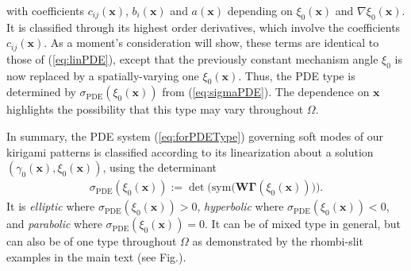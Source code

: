 \documentclass[aps,11pt,tightenlines,notitlepage,superscriptaddress,longbibliography,nofootinbib]{revtex4-1}
\begin{document}
with coefficients $c_{ij}(\mathbf{x})$, $b_i(\mathbf{x})$ and $a(\mathbf{x})$ depending on  $\xi_0(\mathbf{x})$ and $\nabla \xi_0(\mathbf{x})$. It is classified through its highest order derivatives, which involve the coefficients $c_{ij}(\mathbf{x})$. As a moment's consideration will show, these terms are identical to those of (\ref{eq:linPDE}), except  that the previously constant mechanism angle $\xi_0$ is now replaced by a spatially-varying one $\xi_0(\mathbf{x})$. Thus, the PDE type is determined by  $\sigma_{\text{PDE}}(\xi_0(\mathbf{x}))$ from (\ref{eq:sigmaPDE}). The dependence on $\mathbf{x}$ highlights the possibility that this type may vary throughout $\Omega$.

In summary, the PDE system (\ref{eq:forPDEType}) governing soft modes of our kirigami patterns is classified according to its linearization about a solution $(\gamma_0(\mathbf{x}), \xi_0(\mathbf{x}))$, using the determinant 
\begin{equation}
    \begin{aligned}\label{eq:sigmaPDE-general}
    \sigma_{\text{PDE}}(\xi_0(\mathbf{x})) := \det\Big( \text{sym}\big(\mathbf{W} \boldsymbol{\Gamma}(\xi_0(\mathbf{x}))\big)\Big).
    \end{aligned}
\end{equation}
It is \textit{elliptic} where $\sigma_{\text{PDE}}(\xi_0(\mathbf{x})) >0$, \textit{hyperbolic} where $\sigma_{\text{PDE}}(\xi_0(\mathbf{x})) <0$, and \textit{parabolic} where $\sigma_{\text{PDE}}(\xi_0(\mathbf{x})) =0$. It can be of mixed type in general, but can also be of one type throughout $\Omega$ as demonstrated by the rhombi-slit examples in the main text (see Fig.). %
\end{document}
